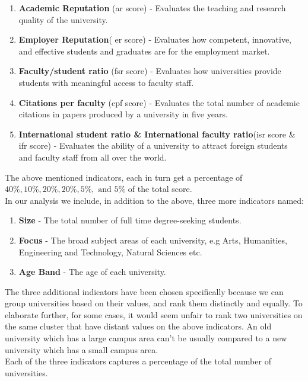 \documentclass[conference]{IEEEtran}
\begin{document}
\begin{enumerate}
    \item \textbf{Academic Reputation} (ar score) - Evaluates the teaching and research quality of the university.
    \item \textbf{Employer Reputation}( er score) - Evaluates how competent, innovative, and effective students and graduates are for the employment market.
    \item \textbf{Faculty/student ratio} (fsr score) - Evaluates how universities provide students with meaningful access to faculty staff.
    \item \textbf{Citations per faculty} (cpf score) - Evaluates the total number of academic citations in papers produced by a university in five years.
    \item \textbf{International student ratio \& International faculty ratio}(isr score \& ifr score) - Evaluates the ability of a university to attract foreign students and faculty staff from all over the world. \\
\end{enumerate}

The above mentioned indicators, each in turn get a percentage of \(40\%, 10\%, 20\%, 20\%, 5\%, \text{ and } 5\%\) of the total score. \\
In our analysis we include, in addition to the above, three more indicators named: \\

\begin{enumerate}
    \item \textbf{Size} - The total number of full time degree-seeking students.
    \item \textbf{Focus} - The broad subject areas of each university, e.g Arts, Humanities, Engineering and Technology, Natural Sciences etc.	
    \item \textbf{Age Band} - The age of each university. \\
\end{enumerate}

The three additional indicators have been chosen specifically because we can group universities based on their values, and rank them distinctly and equally. To elaborate further, for some cases, it would seem unfair to rank two universities on the same cluster that have distant values on the above indicators. An old university which has a large campus area can't be usually compared to a new university which has a small campus area. \\
Each of the three indicators captures a percentage of the total number of universities. \\
\end{document}
